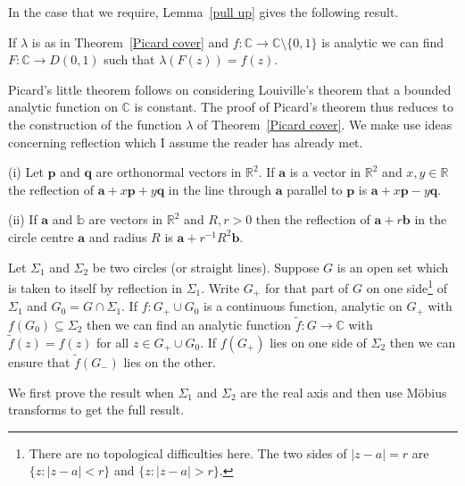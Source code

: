 In the case that we require, 
Lemma~\ref{pull up} gives the following result.
\begin{lemma} If $\lambda$ is as in Theorem~\ref{Picard cover}
and $f:{\mathbb C}\rightarrow{\mathbb C}\setminus\{0,1\}$
is analytic we can find $F:{\mathbb C}\rightarrow D(0,1)$
such that $\lambda(F(z))=f(z)$.
\end{lemma}
Picard's little theorem follows on considering Louiville's
theorem that a bounded analytic function on ${\mathbb C}$
is constant.                                                                  
The proof of Picard's theorem thus reduces to the 
construction of the function
$\lambda$ of Theorem~\ref{Picard cover}.
We make use ideas concerning reflection which
I assume the reader has already met.
\begin{definition} (i) Let ${\mathbf p}$ and ${\mathbf q}$
are orthonormal vectors in ${\mathbb R}^{2}$.
If ${\mathbf a}$ is a vector in ${\mathbb R}^{2}$
and $x,y\in{\mathbb R}$ the reflection of 
${\mathbf a}+x{\mathbf p}+y{\mathbf q}$ in the
line through ${\mathbf a}$ parallel to ${\mathbf p}$
is ${\mathbf a}+x{\mathbf p}-y{\mathbf q}$.

(ii) If ${\mathbf a}$ and ${\mathbb b}$
are vectors in ${\mathbb R}^{2}$ and $R,r>0$
then the reflection of ${\mathbf a}+r{\mathbf b}$
in the circle centre ${\mathbf a}$ and radius $R$
is ${\mathbf a}+r^{-1}R^{2}{\mathbf b}$.
\end{definition}

\begin{lemma}
Let $\Sigma_{1}$ and $\Sigma_{2}$ be two circles
(or straight lines).
Suppose $G$ is an open set which is taken to
itself by reflection in $\Sigma_{1}$. Write $G_{+}$
for that part of $G$ on one side\footnote{There are no
topological difficulties here. The two sides of $|z-a|=r$
are $\{z:|z-a|<r\}$ and $\{z:|z-a|>r\}$.} of 
$\Sigma_{1}$ and $G_{0}=G\cap\Sigma_{1}$.
If $f:G_{+}\cup G_{0}$ is a continuous function,
analytic on $G_{+}$ with $f(G_{0})\subseteq \Sigma_{2}$
then we can find an analytic function 
$\tilde{f}:G\rightarrow{\mathbb C}$ with
$\tilde{f}(z)=f(z)$ for all $z\in G_{+}\cup G_{0}$.
If $f(G_{+})$ lies on one side of $\Sigma_{2}$
then we can ensure that $\tilde{f}(G_{-})$ lies on the other.
\end{lemma}
We first prove the result when $\Sigma_{1}$ and $\Sigma_{2}$
are the real axis and then use M\"{o}bius transforms
to get the full result.

